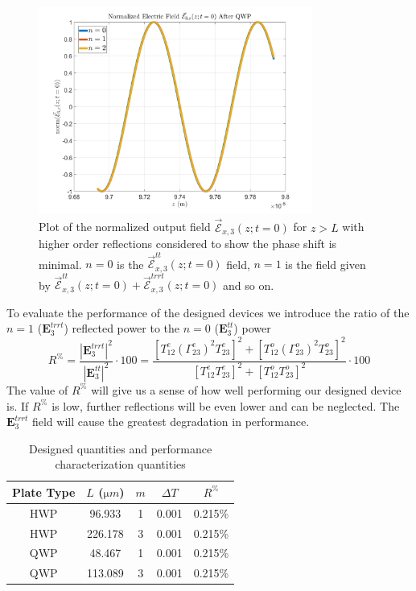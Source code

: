 \documentclass{optica-article}
\newcommand{\bv}[1]{\mathbf{#1}}
\begin{document}
\begin{figure}[h]
  \centering
  \includegraphics[width=0.8\textwidth]{figs/E3_phase.png}
  \caption{Plot of the normalized output field $\vec{\mathscr{E}}_{x,3}(z; t=0)$ for
  $z>L$ with higher order reflections considered to show the phase shift is
  minimal. $n=0$ is the 
  $\vec{\mathscr{E}}^{tt}_{x,3}(z; t=0)$ field, $n=1$ is the field given by
  $\vec{\mathscr{E}}^{tt}_{x,3}(z; t=0) + 
  \vec{\mathscr{E}}^{trrt}_{x,3}(z; t=0)$ and so on.
  }
  \label{fig:E3x_phase}
\end{figure}

To evaluate the performance of the designed devices we introduce the ratio of
the $n=1$ ($\bv{E}_3^{trrt}$) reflected power to the $n=0$ ($\bv{E}_3^{tt}$)
power 
\begin{equation}\label{eq:RP}
R^\% = \frac{|\bv{E}_3^{trrt}|^2}{|\bv{E}_3^{tt}|^2} \cdot 100 = 
\frac{
\left[T^e_{12}(\Gamma^e_{23})^2T^e_{23}\right]^2 + 
\left[T^o_{12}(\Gamma^o_{23})^2T^o_{23}\right]^2
}{\left[T^e_{12}T^e_{23}\right]^2 + 
\left[T^o_{12}T^o_{23}\right]^2} \cdot 100
\end{equation}
The value of $R^\%$ will give us a sense of how well performing our designed
device is. If $R^\%$ is low, further reflections will be even lower and can be
neglected. The $\bv{E}_3^{trrt}$ field will cause the greatest degradation
in performance.

\begin{table}[h]
  \centering
  \begin{tabular}{ccccc}
    Plate Type & $L$ ($\si{\micro m}$) & $m$ & $\Delta T$ & $R^\%$\\\hline \hline
    HWP & 96.933 & 1 & 0.001 & 0.215\%\\\hline
    HWP & 226.178 & 3 & 0.001 & 0.215\%\\\hline
    QWP & 48.467 & 1 & 0.001 & 0.215\%\\\hline
    QWP & 113.089 & 3 & 0.001 & 0.215\%\\\hline
  \end{tabular}
  \caption{Designed quantities and performance characterization quantities}
  \label{tb:Vals}
\end{table}
\end{document}
